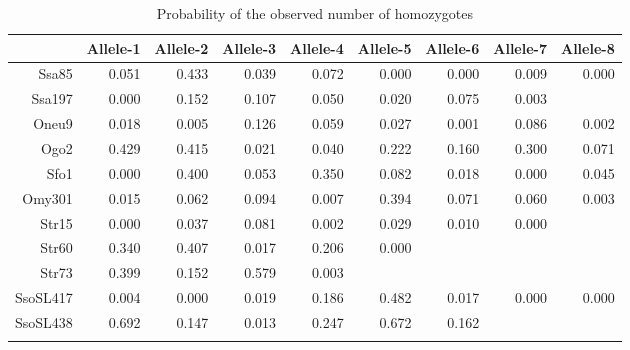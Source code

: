 \documentclass[a4paper]{scrartcl}\usepackage[]{graphicx}\usepackage[]{color}
\newenvironment{knitrout}{}{} %
\begin{document}
\begin{knitrout}
\end{knitrout}

\begin{table}[ht]
\centering
\begin{tabular}{rrrrrrrrr}
  \hline
 & Allele-1 & Allele-2 & Allele-3 & Allele-4 & Allele-5 & Allele-6 & Allele-7 & Allele-8 \\ 
  \hline
Ssa85 & 0.051 & 0.433 & 0.039 & 0.072 & 0.000 & 0.000 & 0.009 & 0.000 \\ 
   \rowcolor[gray]{0.9} Ssa197 & 0.000 & 0.152 & 0.107 & 0.050 & 0.020 & 0.075 & 0.003 &  \\ 
  Oneu9 & 0.018 & 0.005 & 0.126 & 0.059 & 0.027 & 0.001 & 0.086 & 0.002 \\ 
   \rowcolor[gray]{0.9} Ogo2 & 0.429 & 0.415 & 0.021 & 0.040 & 0.222 & 0.160 & 0.300 & 0.071 \\ 
  Sfo1 & 0.000 & 0.400 & 0.053 & 0.350 & 0.082 & 0.018 & 0.000 & 0.045 \\ 
   \rowcolor[gray]{0.9} Omy301 & 0.015 & 0.062 & 0.094 & 0.007 & 0.394 & 0.071 & 0.060 & 0.003 \\ 
  Str15 & 0.000 & 0.037 & 0.081 & 0.002 & 0.029 & 0.010 & 0.000 &  \\ 
   \rowcolor[gray]{0.9} Str60 & 0.340 & 0.407 & 0.017 & 0.206 & 0.000 &  &  &  \\ 
  Str73 & 0.399 & 0.152 & 0.579 & 0.003 &  &  &  &  \\ 
   \rowcolor[gray]{0.9} SsoSL417 & 0.004 & 0.000 & 0.019 & 0.186 & 0.482 & 0.017 & 0.000 & 0.000 \\ 
  SsoSL438 & 0.692 & 0.147 & 0.013 & 0.247 & 0.672 & 0.162 &  &  \\ 
   \rowcolor[gray]{0.9}  \hline
\end{tabular}
\caption{Probability of the observed number of homozygotes} 
\end{table}
\end{document}
